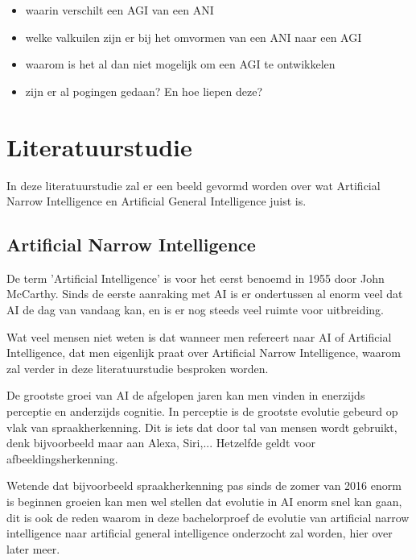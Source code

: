 \begin{itemize}
    \item waarin verschilt een AGI van een ANI
    \item welke valkuilen zijn er bij het omvormen van een ANI naar een AGI
    \item waarom is het al dan niet mogelijk om een AGI te ontwikkelen
    \item zijn er al pogingen gedaan? En hoe liepen deze?
\end{itemize}


\section{Literatuurstudie}
\label{sec:state-of-the-art}

In deze literatuurstudie zal er een beeld gevormd worden over wat Artificial Narrow Intelligence en Artificial General Intelligence juist is.

\subsection{Artificial Narrow Intelligence}

De term 'Artificial Intelligence' is voor het eerst benoemd in 1955 door John McCarthy. Sinds de eerste aanraking met AI is er ondertussen al enorm veel dat AI de dag van vandaag kan, en is er nog steeds veel ruimte voor uitbreiding.

Wat veel mensen niet weten is dat wanneer men refereert naar AI of Artificial Intelligence, dat men eigenlijk praat over Artificial Narrow Intelligence, waarom zal verder in deze literatuurstudie besproken worden. 

De grootste groei van AI de afgelopen jaren kan men vinden in enerzijds perceptie en anderzijds cognitie. In perceptie is de grootste evolutie gebeurd op vlak van spraakherkenning. Dit is iets dat door tal van mensen wordt gebruikt, denk bijvoorbeeld maar aan Alexa, Siri,... Hetzelfde geldt voor afbeeldingsherkenning.

Wetende dat bijvoorbeeld spraakherkenning pas sinds de zomer van 2016 enorm is beginnen groeien kan men wel stellen dat evolutie in AI enorm snel kan gaan, dit is ook de reden waarom in deze bachelorproef de evolutie van artificial narrow intelligence naar artificial general intelligence onderzocht zal worden, hier over later meer. \autocite{brynjolfsson2017artificial}

